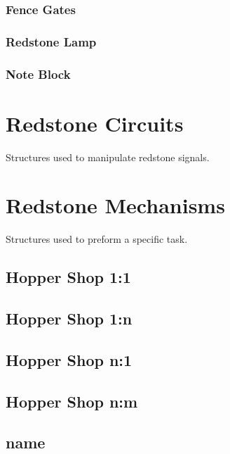 \documentclass[12pt]{article}
\begin{document}
\subsubsection{Fence Gates}
\subsubsection{Redstone Lamp}
\subsubsection{Note Block}

\section{Redstone Circuits}
Structures used to manipulate redstone signals.

\section{Redstone Mechanisms}
Structures used to preform a specific task.

\subsection{Hopper Shop 1:1}

\subsection{Hopper Shop 1:n}

\subsection{Hopper Shop n:1}

\subsection{Hopper Shop n:m}

\subsection{name}
\end{document}
